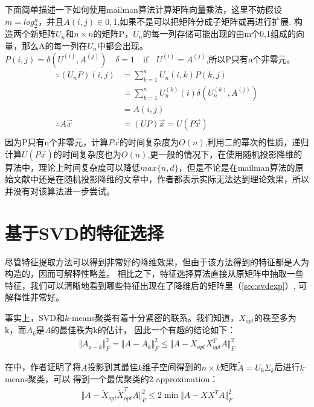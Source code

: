 \documentclass{ctexart}
\begin{document}
    下面简单描述一下如何使用mailman算法计算矩阵向量乘法，这里不妨假设$ m = log_2^n$，并且$A(i,j) \in {0,1}$,如果不是可以把矩阵分成子矩阵或再进行扩展.
    构造两个新矩阵$U_{n}$和$n \times n$的矩阵P，$U_{n}$的每一列存储可能出现的由m个{0,1}组成的向量，那么A的每一列在$U_{n}$中都会出现。$P(i,j) = \delta(U^{(i)},A^{(j)})\quad \delta = 1 \quad \text{if} \quad U^{(i)} = A^{(j)}$,所以P只有n个非零元。
    \begin{align*}
    \because (U_{n}P)(i,j) &=\sum_{k=1}^n U_{n}(i,k)P(k,j)\\
    &=\sum_{k=1}^n U_{n}^{(k)}(i)\delta (U_{n}^{(k)},A^{(j)})\\
    &=A(i,j)\\
    \therefore A\vec{x} &=(UP)\vec{x} = U(P\vec{x})\\
    \end{align*}
    因为P只有n个非零元，计算$P\vec{x}$的时间复杂度为$O(n)$,利用二的幂次的性质，递归计算$U(P\vec{x})$的时间复杂度也为$O(n)$,更一般的情况下，在使用随机投影降维的算法中，理论上时间复杂度可以降低$max\{n,d\}$，但是不论是在mailman算法的原始文献中还是在随机投影降维的文章中，作者都表示实际无法达到理论效果，所以并没有对该算法进一步尝试。


    \section{基于SVD的特征选择}
    \label{sec:svdsec}
    尽管特征提取方法可以得到非常好的降维效果，但由于该方法得到的特征都是人为构造的，因而可解释性略差。
    相比之下，特征选择算法直接从原矩阵中抽取一些特征，我们可以清晰地看到哪些特征出现在了降维后的矩阵里（\autoref{sec:svdexp}）,
    可解释性非常好。

    事实上，SVD和$k$-means聚类有着十分紧密的联系。我们知道，$X_{opt}$的秩至多为k，而$A_k$是$A$的最佳秩为k的估计，
    因此一个有趣的结论如下：
    \begin{align*}
        \Vert A_{\rho - k} \Vert_F^2 = \Vert A - A_k \Vert_F^2 \leq \Vert A - X_{opt} X_{opt}^T A \Vert_F^2
    \end{align*}
    
    在\cite{drineas1999clustering}中，作者证明了将$A$投影到其最佳$k$维子空间得到的$n \times k$矩阵$\tilde{A}=U_k \Sigma_k$后进行$k$-means聚类，可以
    得到一个最优聚类的2-approximation：
    \begin{align*}
        \Vert A - \tilde{X}_{opt} \tilde{X}_{opt}^T A \Vert_F^2 \leq 2 \min \Vert A - X X^T A \Vert_F^2
    \end{align*}
\end{document}
